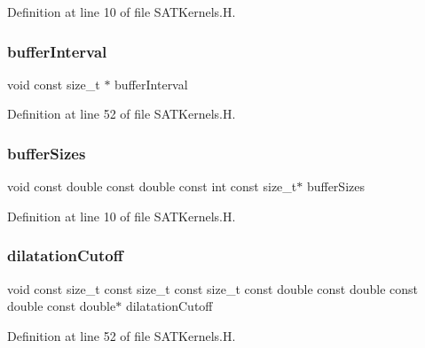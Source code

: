 Definition at line 10 of file S\+A\+T\+Kernels.\+H.

\hypertarget{SATKernels_8H_a4caa6f5ca62531b8c31e22919f206d68}{}\label{SATKernels_8H_a4caa6f5ca62531b8c31e22919f206d68} 
\subsubsection{\texorpdfstring{buffer\+Interval}{bufferInterval}}
{\footnotesize\ttfamily void const size\+\_\+t $\ast$ buffer\+Interval}



Definition at line 52 of file S\+A\+T\+Kernels.\+H.

\hypertarget{SATKernels_8H_a74eeadd5b4c053a55bbae02e9e6d690d}{}\label{SATKernels_8H_a74eeadd5b4c053a55bbae02e9e6d690d} 
\subsubsection{\texorpdfstring{buffer\+Sizes}{bufferSizes}}
{\footnotesize\ttfamily void const double const double const int const size\+\_\+t$\ast$ buffer\+Sizes}



Definition at line 10 of file S\+A\+T\+Kernels.\+H.

\hypertarget{SATKernels_8H_afe603e2783dc402c56709682a723b77e}{}\label{SATKernels_8H_afe603e2783dc402c56709682a723b77e} 
\subsubsection{\texorpdfstring{dilatation\+Cutoff}{dilatationCutoff}}
{\footnotesize\ttfamily void const size\+\_\+t const size\+\_\+t const size\+\_\+t const double const double const double const double$\ast$ dilatation\+Cutoff}



Definition at line 52 of file S\+A\+T\+Kernels.\+H.

\hypertarget{SATKernels_8H_ac59bb34f1cc96772cd2ff3b13a040a57}{}\label{SATKernels_8H_ac59bb34f1cc96772cd2ff3b13a040a57} 
